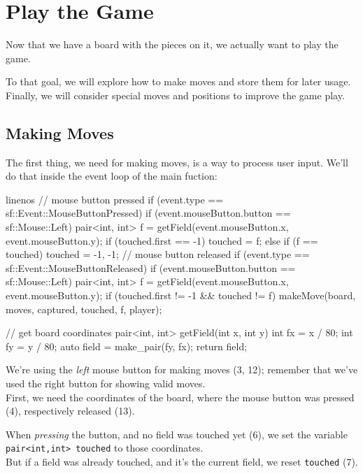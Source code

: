 \chapter{Play the Game}

Now that we have a board with the pieces on it, we actually want to play the game.

To that goal, we will explore how to make moves and store them for later usage.
Finally, we will consider special moves and positions to improve the game play.

\section{Making Moves}\label{sec:makemoves}

The first thing, we need for making moves, is a way to process user input.
We'll do that inside the event loop of the main fuction:

\begin{cpp*}{linenos}
// mouse button pressed
if (event.type == sf::Event::MouseButtonPressed) {
  if (event.mouseButton.button == sf::Mouse::Left) {
    pair<int, int> f = getField(event.mouseButton.x,
                                event.mouseButton.y);
    if (touched.first == -1) touched = f;
    else if (f == touched) touched = {-1, -1};
  }
}
// mouse button released
if (event.type == sf::Event::MouseButtonReleased) {
  if (event.mouseButton.button == sf::Mouse::Left) {
    pair<int, int> f = getField(event.mouseButton.x,
                                event.mouseButton.y);
    if (touched.first != -1 && touched != f)
      makeMove(board, moves, captured, touched, f, player);
  }
}

// get board coordinates
pair<int, int> getField(int x, int y) {
  int fx = x / 80;
  int fy = y / 80;
  auto field = make_pair(fy, fx);
  return field;
}
\end{cpp*}

We're using the \emph{left} mouse button for making moves (3, 12); remember that we've
used the right button for showing valid moves.\\
First, we need the coordinates of the board, where the mouse button was pressed (4),
respectively released (13).

When \emph{pressing} the button, and no field was touched yet (6), we set the variable\\
\texttt{pair<int,int> touched} to those coordinates.\\
But if a field was already touched, and it's the current field, we reset
\texttt{touched} (7).

